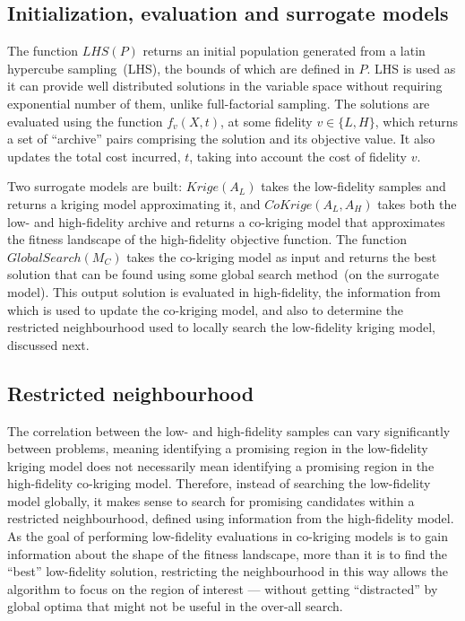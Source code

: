 \subsection{Initialization, evaluation and surrogate models}
The function $LHS(P)$ returns an initial population generated from a latin hypercube sampling~(LHS), the bounds of which are defined in $P$. LHS is used as it can provide well distributed solutions in the variable space without requiring exponential number of them, unlike full-factorial sampling. The solutions are evaluated using the function $f_v(X,t)$, at some fidelity $v\in \{L,H\}$, which returns a set of ``archive'' pairs comprising the solution and its objective value. It also updates the total cost incurred, $t$, taking into account the cost of fidelity $v$. 

Two surrogate models are built: $Krige(A_L)$ takes the low-fidelity samples and returns a kriging model approximating it, and $CoKrige(A_L,A_H)$ takes both the low- and high-fidelity archive and returns a co-kriging model that approximates the fitness landscape of the high-fidelity objective function. The function $GlobalSearch(M_C)$ takes the co-kriging model as input and returns the best solution that can be found using some global search method~(on the surrogate model). This output solution is evaluated in high-fidelity, the information from which is used to update the co-kriging model, and also to determine the restricted neighbourhood used to locally search the low-fidelity kriging model, discussed next.

\subsection{Restricted neighbourhood}\label{subsec:restrict}
The correlation between the low- and high-fidelity samples can vary significantly between problems, meaning identifying a promising region in the low-fidelity kriging model does not necessarily mean identifying a promising region in the high-fidelity co-kriging model. Therefore, instead of searching the low-fidelity model globally, it makes sense to search for promising candidates within a restricted neighbourhood, defined using information from the high-fidelity model. As the goal of performing low-fidelity evaluations in co-kriging models is to gain information about the shape of the fitness landscape, more than it is to find the ``best'' low-fidelity solution, restricting the neighbourhood in this way allows the algorithm to focus on the region of interest --- without getting ``distracted'' by global optima that might not be useful in the over-all search.

